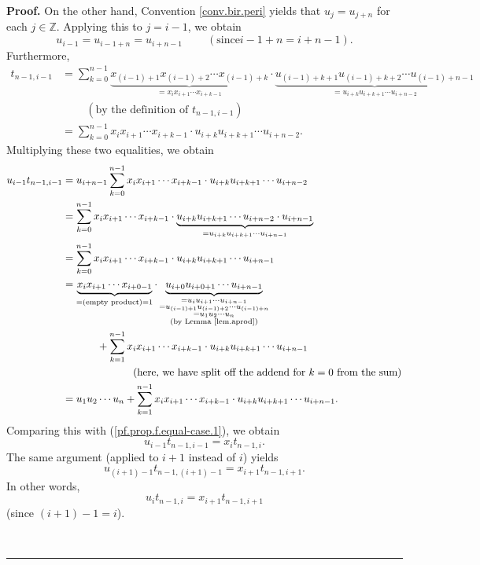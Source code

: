\documentclass[numbers=enddot,12pt,final,onecolumn,notitlepage]{scrartcl}%
\theoremstyle{definition}
\newenvironment{proof}[1][Proof]{\noindent\textbf{#1.} }{\ \rule{0.5em}{0.5em}}
\let\sumnonlimits\sum
\renewcommand{\sum}{\sumnonlimits\limits}
\newenvironment{verlong}{}{}
\begin{document}
\begin{proof}
\begin{verlong}
On the other hand, Convention \ref{conv.bir.peri} yields that $u_{j}=u_{j+n}$
for each $j\in\mathbb{Z}$. Applying this to $j=i-1$, we obtain%
\[
u_{i-1}=u_{i-1+n}=u_{i+n-1}\ \ \ \ \ \ \ \ \ \ \left(  \text{since
}i-1+n=i+n-1\right)  .
\]
Furthermore,%
\begin{align*}
t_{n-1,i-1}  &  =\sum_{k=0}^{n-1}\underbrace{x_{\left(  i-1\right)
+1}x_{\left(  i-1\right)  +2}\cdots x_{\left(  i-1\right)  +k}}_{=x_{i}%
x_{i+1}\cdots x_{i+k-1}}\cdot\underbrace{u_{\left(  i-1\right)  +k+1}%
u_{\left(  i-1\right)  +k+2}\cdots u_{\left(  i-1\right)  +n-1}}%
_{=u_{i+k}u_{i+k+1}\cdots u_{i+n-2}}\\
&  \ \ \ \ \ \ \ \ \ \ \left(  \text{by the definition of }t_{n-1,i-1}\right)
\\
&  =\sum_{k=0}^{n-1}x_{i}x_{i+1}\cdots x_{i+k-1}\cdot u_{i+k}u_{i+k+1}\cdots
u_{i+n-2}.
\end{align*}
Multiplying these two equalities, we obtain%
\begin{align*}
u_{i-1}t_{n-1,i-1}  &  =u_{i+n-1}\sum_{k=0}^{n-1}x_{i}x_{i+1}\cdots
x_{i+k-1}\cdot u_{i+k}u_{i+k+1}\cdots u_{i+n-2}\\
&  =\sum_{k=0}^{n-1}x_{i}x_{i+1}\cdots x_{i+k-1}\cdot\underbrace{u_{i+k}%
u_{i+k+1}\cdots u_{i+n-2}\cdot u_{i+n-1}}_{=u_{i+k}u_{i+k+1}\cdots u_{i+n-1}%
}\\
&  =\sum_{k=0}^{n-1}x_{i}x_{i+1}\cdots x_{i+k-1}\cdot u_{i+k}u_{i+k+1}\cdots
u_{i+n-1}\\
&  =\underbrace{x_{i}x_{i+1}\cdots x_{i+0-1}}_{=\left(  \text{empty
product}\right)  =1}\cdot\underbrace{u_{i+0}u_{i+0+1}\cdots u_{i+n-1}%
}_{\substack{=u_{i}u_{i+1}\cdots u_{i+n-1}\\=u_{\left(  i-1\right)
+1}u_{\left(  i-1\right)  +2}\cdots u_{\left(  i-1\right)  +n}\\=u_{1}%
u_{2}\cdots u_{n}\\\text{(by Lemma \ref{lem.aprod})}}}\\
&  \ \ \ \ \ \ \ \ \ \ +\sum_{k=1}^{n-1}x_{i}x_{i+1}\cdots x_{i+k-1}\cdot
u_{i+k}u_{i+k+1}\cdots u_{i+n-1}\\
&  \ \ \ \ \ \ \ \ \ \ \ \ \ \ \ \ \ \ \ \ \left(  \text{here, we have split
off the addend for }k=0\text{ from the sum}\right) \\
&  =u_{1}u_{2}\cdots u_{n}+\sum_{k=1}^{n-1}x_{i}x_{i+1}\cdots x_{i+k-1}\cdot
u_{i+k}u_{i+k+1}\cdots u_{i+n-1}.
\end{align*}
Comparing this with (\ref{pf.prop.f.equal-case.1}), we obtain%
\begin{equation}
u_{i-1}t_{n-1,i-1}=x_{i}t_{n-1,i}. \label{pf.prop.f.equal-case.4}%
\end{equation}
The same argument (applied to $i+1$ instead of $i$) yields%
\[
u_{\left(  i+1\right)  -1}t_{n-1,\left(  i+1\right)  -1}=x_{i+1}t_{n-1,i+1}.
\]
In other words,%
\begin{equation}
u_{i}t_{n-1,i}=x_{i+1}t_{n-1,i+1} \label{pf.prop.f.equal-case.5}%
\end{equation}
(since $\left(  i+1\right)  -1=i$).


\end{verlong}
\end{proof}
\end{document}
